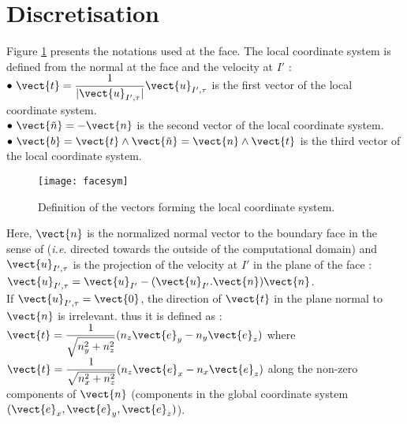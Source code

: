 \section*{Discretisation}

Figure \ref{Base_Clsyvt_fig_facesym} presents the notations used at the face.
The local coordinate system is defined from the normal at the face and
the velocity at $I'$ :\\
$\bullet\ \displaystyle\vect{t}
=\frac{1}{|\vect{u}_{I',\tau}|}\vect{u}_{I',\tau}$ is the first
vector of the local coordinate system.\\
$\bullet\ \vect{\tilde{n}}=-\vect{n}$ is the second
vector of the local coordinate system.\\
$\bullet\ \vect{b}=\vect{t}\wedge\vect{\tilde{n}}=\vect{n}\wedge\vect{t}$
is the third
vector of the local coordinate system.\\

\begin{figure}[h]
\centerline{\texttt{[image: facesym]}}
\caption{\label{Base_Clsyvt_fig_facesym}Definition of the vectors forming the local coordinate system.}
\end{figure}

Here, $\vect{n}$ is the normalized normal vector to the boundary face
in the sense of  \CS ({\em i.e.}
directed towards the outside of the computational domain)
and $\vect{u}_{I',\tau}$ is the projection of the velocity at $I'$
in the plane of the face :
$\vect{u}_{I',\tau}=\vect{u}_{I'}-(\vect{u}_{I'}.\vect{n})\vect{n}$.\\
If $\vect{u}_{I',\tau}=\vect{0}$, the direction of $\vect{t}$ in the plane
normal to $\vect{n}$ is irrelevant. thus it is defined as :
$\displaystyle\vect{t}=\frac{1}{\sqrt{n_y^2+n_z^2}}(n_z\vect{e}_y-n_y\vect{e}_z)$
where
$\displaystyle\vect{t}=\frac{1}{\sqrt{n_x^2+n_z^2}}(n_z\vect{e}_x-n_x\vect{e}_z)$
along the non-zero components of $\vect{n}$ (components in the global
coordinate system $(\vect{e}_x,\vect{e}_y,\vect{e}_z)$).


